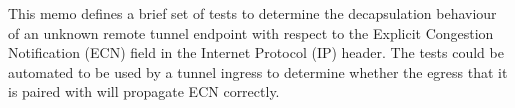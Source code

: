 
This memo defines a brief set of tests to determine the decapsulation behaviour of an unknown remote tunnel endpoint with respect to the Explicit Congestion Notification (ECN) field in the Internet Protocol (IP) header. The tests could be automated to be used by a tunnel ingress to determine whether the egress that it is paired with will propagate ECN correctly.


